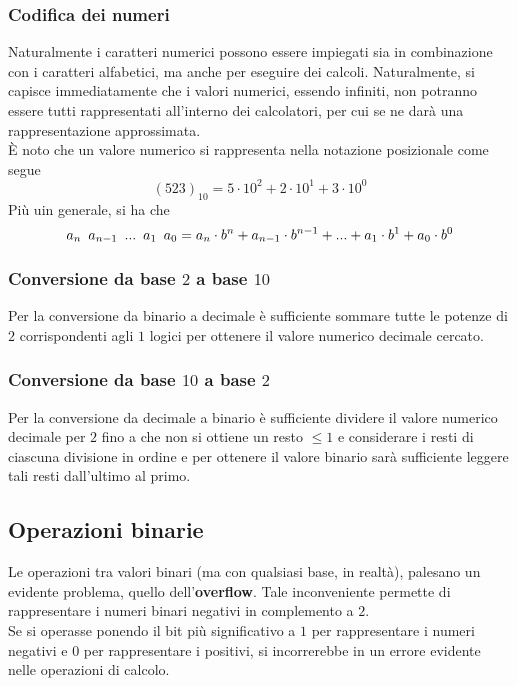 \documentclass[a4paper]{extarticle}
\begin{document}
\vspace{1em}
\subsubsection{Codifica dei numeri}
Naturalmente i caratteri numerici possono essere impiegati sia in combinazione con i caratteri alfabetici, ma anche per eseguire dei calcoli. Naturalmente, si capisce immediatamente che i valori numerici, essendo infiniti, non potranno essere tutti rappresentati all'interno dei calcolatori, per cui se ne darà una rappresentazione approssimata.\\
È noto che un valore numerico si rappresenta nella notazione posizionale come segue
\[(523)_{10} = 5 \cdot 10^2 + 2 \cdot 10^1 + 3 \cdot 10^0\]
Più uin generale, si ha che
\[a_n \hspace{0.5em} a_{n - 1} \hspace{0.5em} ... \hspace{0.5em} a_1 \hspace{0.5em} a_0 = a_n \cdot b^n + a_{n - 1} \cdot b^{n - 1} + ... + a_1 \cdot b^1 + a_0 \cdot b^0\]

\vspace{1em}
\subsubsection{Conversione da base \(2\) a base \(10\)}
Per la conversione da binario a decimale è sufficiente sommare tutte le potenze di \(2\) corrispondenti agli \(1\) logici per ottenere il valore numerico decimale cercato.

\vspace{1em}
\subsubsection{Conversione da base \(10\) a base \(2\)}
Per la conversione da decimale a binario è sufficiente dividere il valore numerico decimale per \(2\) fino a che non si ottiene un resto \(\leq 1\) e considerare i resti di ciascuna divisione in ordine e per ottenere il valore binario sarà sufficiente leggere tali resti dall'ultimo al primo.

\vspace{1em}
\subsection{Operazioni binarie}
Le operazioni tra valori binari (ma con qualsiasi base, in realtà), palesano un evidente problema, quello dell'\textbf{overflow}. Tale inconveniente permette di rappresentare i numeri binari negativi in complemento a \(2\).\\
Se si operasse ponendo il bit più significativo a \(1\) per rappresentare i numeri negativi e \(0\) per rappresentare i positivi, si incorrerebbe in un errore evidente nelle operazioni di calcolo.
\end{document}
